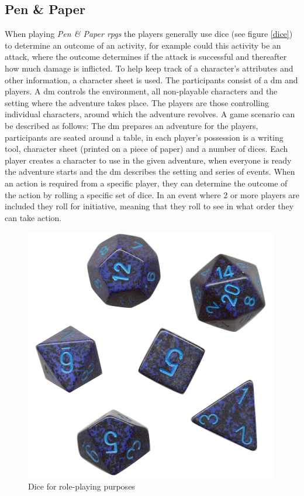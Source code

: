\subsection{Pen \& Paper}
When playing \emph{Pen \& Paper \ac{rpgs}} the players generally use dice (see figure \vref{dice}) to determine an outcome of an activity, for example could this activity be an attack, where the outcome determines if the attack is successful and thereafter how much damage is inflicted. To help keep track of a character's attributes and other information, a character sheet is used.
The participants consist of a \ac{dm} and players. A \ac{dm} controls the environment, all non-playable characters and the setting where the adventure takes place. The players are those controlling individual characters, around which the adventure revolves. A game scenario can be described as follows:
The \ac{dm} prepares an adventure for the players, participants are seated around a table, in each player's possession is a writing tool, character sheet (printed on a piece of paper) and a number of dices. Each player creates a character to use in the given adventure, when everyone is ready the adventure starts and the \ac{dm} describes the setting and series of events. When an action is required from a specific player, they can determine the outcome of the action by rolling a specific set of dice. In an event where 2 or more players are included they roll for initiative, meaning that they roll to see in what order they can take action.
\begin{figure}[!h]
\centering
\includegraphics[scale=0.4]{img/rpgdice.png}
\caption{Dice for role-playing purposes}
\label{dice}
\end{figure}

